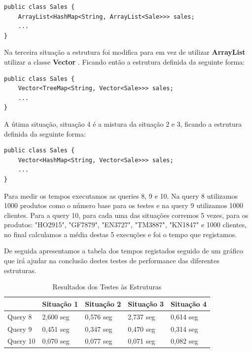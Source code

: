 \documentclass[10pt] {article}
\begin{document}
\begin{lstlisting}
public class Sales {
	ArrayList<HashMap<String, ArrayList<Sale>>> sales;
	...
}
\end{lstlisting}

\par Na terceira situação a estrutura foi modifica para em vez de utilizar \color{blue} \textbf{ArrayList} \color{black} utilizar a
classe  \color{blue} \textbf{Vector} \color{black} . Ficando então a estrutura definida da seguinte forma:

\begin{lstlisting}
public class Sales {
	Vector<TreeMap<String, Vector<Sale>>> sales;
	...
}
\end{lstlisting}

\par A útima situação, situação 4 é a mistura da situação 2 e 3, ficando a estrutura definida da seguinte forma:

\begin{lstlisting}
public class Sales {
	Vector<HashMap<String, Vector<Sale>>> sales;
	...
}
\end{lstlisting}

\par Para medir os tempos executamos as queries 8, 9 e 10. Na query 8 utilizamos 1000 produtos como o número base
para os testes e na query 9 utilizamos 1000 clientes. Para a query 10, para cada uma das situações corremos 5 vezes,
para os produtos: "HO2915", "GF7879", "EN3727", "TM3887", "KN1847" e 1000 clientes, no final calculamos a média destas 5
execuções e foi o tempo que registamos.
\par De seguida apresentamos a tabela dos tempos registados seguido de um gráfico que irá ajudar na conclusão destes
testes de performance das diferentes estruturas.

\newpage

\begin{table}[h]
\centering
\caption{Resultados dos Testes às Estruturas}
\begin{tabular}{l|l|l|l|l|}
\cline{2-5}
                               & Situação 1 & Situação 2 & Situação 3 & Situação 4 \\ \hline
\multicolumn{1}{|l|}{Query 8}  & 2,600 seg  & 0,576 seg  & 2,737 seg  & 0,614 seg  \\ \hline
\multicolumn{1}{|l|}{Query 9}  & 0,451 seg  & 0,347 seg  & 0,470 seg  & 0,314 seg  \\ \hline
\multicolumn{1}{|l|}{Query 10} & 0,070 seg  & 0,077 seg  & 0,071 seg  & 0,082 seg  \\ \hline
\end{tabular}
\end{table}
\end{document}
